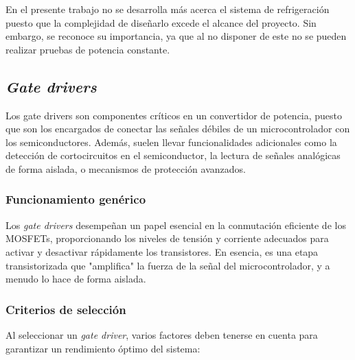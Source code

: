 En el presente trabajo no se desarrolla más acerca el sistema de refrigeración puesto que la complejidad de diseñarlo excede el alcance del proyecto. Sin embargo, se reconoce su importancia, ya que al no disponer de este no se pueden realizar pruebas de potencia constante.

\subsection{\textit{Gate drivers}}

Los gate drivers son componentes críticos en un convertidor de potencia, puesto que son los encargados de conectar las señales débiles de un microcontrolador con los semiconductores. Además, suelen llevar funcionalidades adicionales como la detección de cortocircuitos en el semiconductor, la lectura de señales analógicas de forma aislada, o mecanismos de protección avanzados.

\subsubsection{Funcionamiento genérico}

Los \textit{gate drivers} desempeñan un papel esencial en la conmutación eficiente de los MOSFETs, proporcionando los niveles de tensión y corriente adecuados para activar y desactivar rápidamente los transistores. En esencia, es una etapa transistorizada que "amplifica" la fuerza de la señal del microcontrolador, y a menudo lo hace de forma aislada.

\subsubsection{Criterios de selección}

Al seleccionar un \textit{gate driver}, varios factores deben tenerse en cuenta para garantizar un rendimiento óptimo del sistema:

